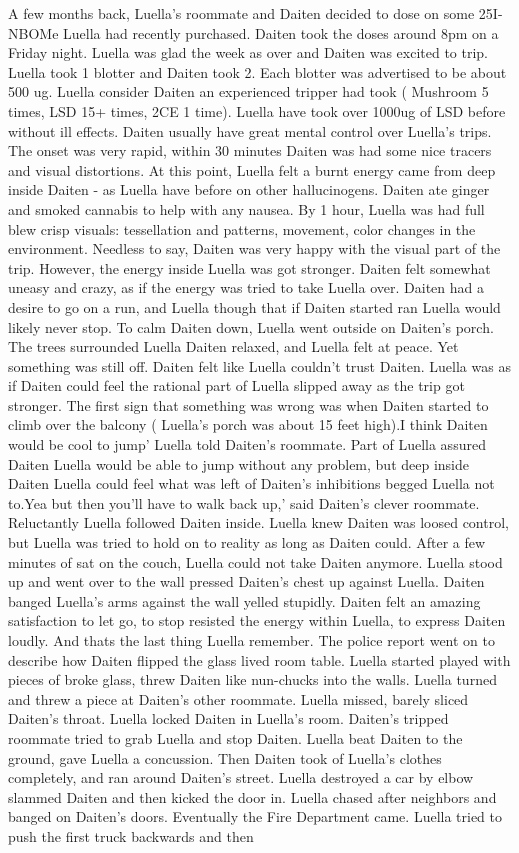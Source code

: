 \documentclass[12pt]{book}
\begin{document}
A few months back, Luella's roommate and Daiten decided to dose on some 25I-NBOMe Luella had recently purchased. Daiten took the doses around 8pm on a Friday night. Luella was glad the week as over and Daiten was excited to trip. Luella took 1 blotter and Daiten took 2. Each blotter was advertised to be about 500 ug. Luella consider Daiten an experienced tripper had took ( Mushroom 5 times, LSD 15+ times, 2CE 1 time). Luella have took over 1000ug of LSD before without ill effects. Daiten usually have great mental control over Luella's trips. The onset was very rapid, within 30 minutes Daiten was had some nice tracers and visual distortions. At this point, Luella felt a burnt energy came from deep inside Daiten - as Luella have before on other hallucinogens. Daiten ate ginger and smoked cannabis to help with any nausea. By 1 hour, Luella was had full blew crisp visuals: tessellation and patterns, movement, color changes in the environment. Needless to say, Daiten was very happy with the visual part of the trip. However, the energy inside Luella was got stronger. Daiten felt somewhat uneasy and crazy, as if the energy was tried to take Luella over. Daiten had a desire to go on a run, and Luella though that if Daiten started ran Luella would likely never stop. To calm Daiten down, Luella went outside on Daiten's porch. The trees surrounded Luella Daiten relaxed, and Luella felt at peace. Yet something was still off. Daiten felt like Luella couldn't trust Daiten. Luella was as if Daiten could feel the rational part of Luella slipped away as the trip got stronger. The first sign that something was wrong was when Daiten started to climb over the balcony ( Luella's porch was about 15 feet high).I think Daiten would be cool to jump' Luella told Daiten's roommate. Part of Luella assured Daiten Luella would be able to jump without any problem, but deep inside Daiten Luella could feel what was left of Daiten's inhibitions begged Luella not to.Yea but then you'll have to walk back up,' said Daiten's clever roommate. Reluctantly Luella followed Daiten inside. Luella knew Daiten was loosed control, but Luella was tried to hold on to reality as long as Daiten could. After a few minutes of sat on the couch, Luella could not take Daiten anymore. Luella stood up and went over to the wall pressed Daiten's chest up against Luella. Daiten banged Luella's arms against the wall yelled stupidly. Daiten felt an amazing satisfaction to let go, to stop resisted the energy within Luella, to express Daiten loudly. And thats the last thing Luella remember. The police report went on to describe how Daiten flipped the glass lived room table. Luella started played with pieces of broke glass, threw Daiten like nun-chucks into the walls. Luella turned and threw a piece at Daiten's other roommate. Luella missed, barely sliced Daiten's throat. Luella locked Daiten in Luella's room. Daiten's tripped roommate tried to grab Luella and stop Daiten. Luella beat Daiten to the ground, gave Luella a concussion. Then Daiten took of Luella's clothes completely, and ran around Daiten's street. Luella destroyed a car by elbow slammed Daiten and then kicked the door in. Luella chased after neighbors and banged on Daiten's doors. Eventually the Fire Department came. Luella tried to push the first truck backwards and then 
\end{document}
